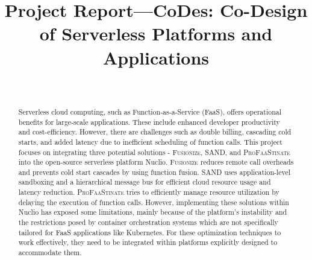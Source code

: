 \documentclass[a4paper, twoside]{IEEEtran}
\begin{document}
\title{Project Report—CoDes: Co-Design of Serverless Platforms and Applications}

\author{
    \\
}

\maketitle
\thispagestyle{plain}
\pagestyle{plain}

\begin{abstract}

    Serverless cloud computing, such as Function-as-a-Service (FaaS), offers
    operational benefits for large-scale applications. These include enhanced
    developer productivity and cost-efficiency. However, there are challenges
    such as double billing, cascading cold starts, and added latency due to
    inefficient scheduling of function calls. This project focuses on
    integrating three potential solutions - \textsc{Fusionize}, SAND, and
    \textsc{ProFaaStinate} into the open-source serverless platform Nuclio.
    \textsc{Fusionize} reduces remote call overheads and prevents cold start
    cascades by using function fusion. SAND uses application-level sandboxing
    and a hierarchical message bus for efficient cloud resource usage and
    latency reduction. \textsc{ProFaaStinate} tries to efficiently manage
    resource utilization by delaying the execution of function calls. However,
    implementing these solutions within Nuclio has exposed some limitations,
    mainly because of the platform's instability and the restrictions posed by
    container orchestration systems which are not specifically tailored for FaaS
    applications like Kubernetes. For these optimization techniques to work
    effectively, they need to be integrated within platforms explicitly designed
    to accommodate them.

\end{abstract}

\setcounter{tocdepth}{1}
\tableofcontents
\end{document}

